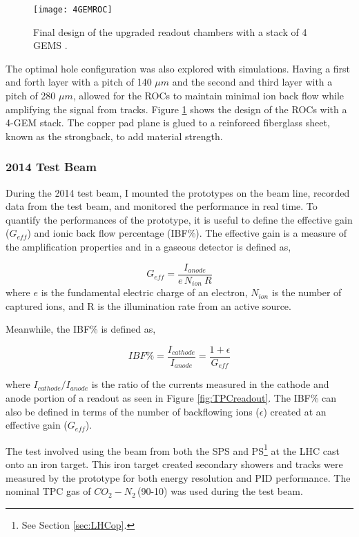 \begin{figure}[h]
\texttt{[image: 4GEMROC]}
\centering
\caption{Final design of the upgraded readout chambers with a stack of 4 GEMS \cite{CERN-LHCC-2013-020}. }
\label{fig:4GEM}
\end{figure}

The optimal hole configuration was also explored with simulations.  Having a first and forth layer with a pitch of 140 $\mu m$ and the second and third layer with a pitch of 280 $\mu m$, allowed for the ROCs to maintain minimal ion back flow while amplifying the signal from tracks.  Figure \ref{fig:4GEM} shows the design of the ROCs with a 4-GEM stack.  The copper pad plane is glued to a reinforced fiberglass sheet, known as the strongback, to add material strength.

\subsubsection{2014 Test Beam}

During the 2014 test beam, I mounted the prototypes on the beam line, recorded data from the test beam, and monitored the performance in real time.  To quantify the performances of the prototype, it is useful to define the effective gain ($G_{eff}$) and ionic back flow percentage (IBF\%).  The effective gain is a measure of the amplification properties and in a gaseous detector is defined as,

\begin{equation}
G_{eff}=\frac{I_{anode}}{\textit{e} \,  N_{ion} \ R}
\label{eq:gain}
\end{equation}
\noindent
where $\textit{e}$ is the fundamental electric charge of an electron, $N_{ion}$ is the number of captured ions, and R is the illumination rate from an active source.

Meanwhile, the IBF\% is defined as,

\begin{equation}
IBF \% = \frac{ I_{cathode} }{ I_{anode} } = \frac{1 + \epsilon }{ G_{eff} }
\label{eq:IBF}
\end{equation}

\noindent
where $ I_{cathode} / I_{anode}$ is the ratio of the currents measured in the cathode and anode portion of a readout as seen in Figure \ref{fig:TPCreadout}.  The IBF\% can also be defined in terms of the number of backflowing ions ($\epsilon$) created at an effective gain ($G_{eff}$).  

The test involved using the beam from both the SPS and PS\footnote{See Section \ref{sec:LHCop}.} at the LHC cast onto an iron target.  This iron target created secondary showers and tracks were measured by the prototype for both energy resolution and PID performance.  The nominal TPC gas of $CO_{2}-N_{2}\,$(90-10) was used during the test beam.  

